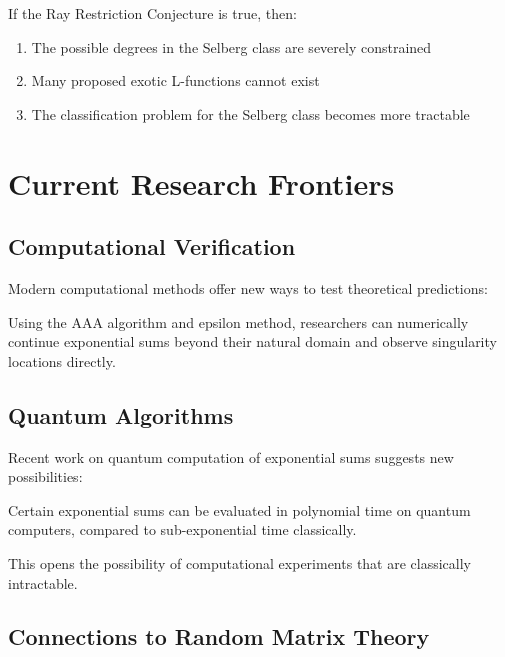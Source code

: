 \begin{theorem}
If the Ray Restriction Conjecture is true, then:
\begin{enumerate}
\item The possible degrees in the Selberg class are severely constrained
\item Many proposed exotic L-functions cannot exist
\item The classification problem for the Selberg class becomes more tractable
\end{enumerate}
\end{theorem}

\section{Current Research Frontiers}
\label{sec:frontiers}

\subsection{Computational Verification}

Modern computational methods offer new ways to test theoretical predictions:

\begin{example}
Using the AAA algorithm and epsilon method, researchers can numerically continue exponential sums beyond their natural domain and observe singularity locations directly.
\end{example}

\subsection{Quantum Algorithms}

Recent work on quantum computation of exponential sums suggests new possibilities:

\begin{theorem}
Certain exponential sums can be evaluated in polynomial time on quantum computers, compared to sub-exponential time classically.
\end{theorem}

This opens the possibility of computational experiments that are classically intractable.

\subsection{Connections to Random Matrix Theory}

